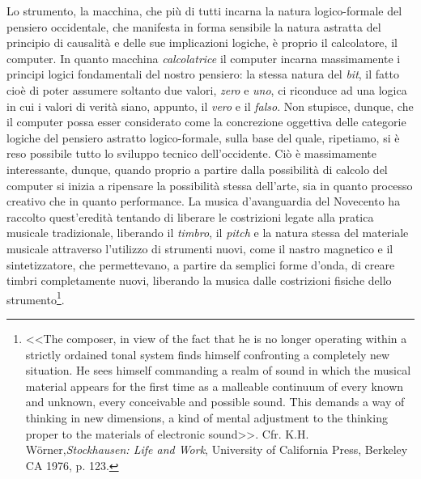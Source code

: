 \documentclass[a4paper,12pt]{scrartcl}
\begin{document}
    Lo strumento, la macchina, che più di tutti incarna la natura logico-formale del pensiero occidentale, che manifesta in forma sensibile la natura astratta del principio di causalità e delle sue implicazioni logiche, è proprio il calcolatore, il computer. In quanto macchina \emph{calcolatrice} il computer incarna massimamente i principi logici fondamentali del nostro pensiero: la stessa natura del \emph{bit}, il fatto cioè di poter assumere soltanto due valori, \emph{zero} e \emph{uno}, ci riconduce ad una logica in cui i valori di verità siano, appunto, il \emph{vero} e il \emph{falso}. Non stupisce, dunque, che il computer possa esser considerato come la concrezione oggettiva delle categorie logiche del pensiero astratto logico-formale, sulla base del quale, ripetiamo, si è reso possibile tutto lo sviluppo tecnico dell'occidente. Ciò è massimamente interessante, dunque, quando proprio a partire dalla possibilità di calcolo del computer si inizia a ripensare la possibilità stessa dell'arte, sia in quanto processo creativo che in quanto performance. La musica d'avanguardia del Novecento ha raccolto quest'eredità tentando di liberare le costrizioni legate alla pratica musicale tradizionale, liberando il \emph{timbro}, il \emph{pitch} e la natura stessa del materiale musicale attraverso l'utilizzo di strumenti nuovi, come il nastro magnetico e il sintetizzatore, che permettevano, a partire da semplici forme d'onda, di creare timbri completamente nuovi, liberando la musica dalle costrizioni fisiche dello strumento\footnote{<<The composer, in view of the fact that he is no longer operating within a strictly ordained tonal system finds himself confronting a completely new situation. He sees himself commanding a realm of sound in which the musical material appears for the first time as a malleable continuum of every known and unknown, every conceivable and possible sound. This demands a way of thinking in new dimensions, a kind of mental adjustment to the thinking proper to the materials of electronic sound>>. Cfr. K.H. W{\"o}rner,\textit{Stockhausen: Life and Work}, University of California Press, Berkeley CA 1976, p. 123.}.
\end{document}
